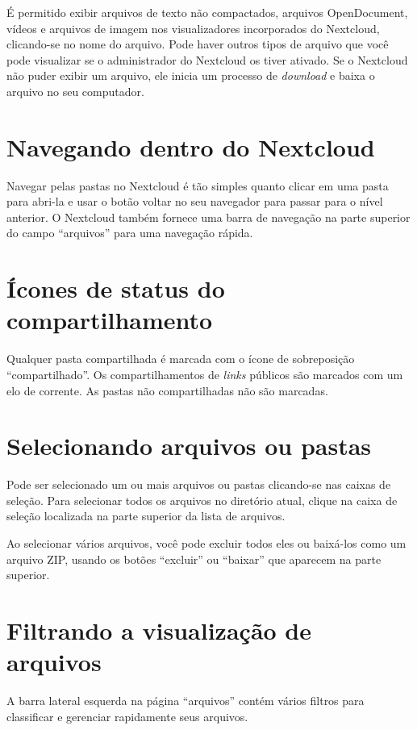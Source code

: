 \documentclass[openright, twoside, a4paper]{memoir}
\begin{document}
É permitido exibir arquivos de texto não compactados, arquivos
OpenDocument, vídeos e arquivos de imagem nos visualizadores
incorporados do Nextcloud, clicando-se no nome do arquivo. Pode haver
outros tipos de arquivo que você pode visualizar se o administrador do
Nextcloud os tiver ativado. Se o Nextcloud não puder exibir um arquivo,
ele inicia um processo de \emph{download} e baixa o arquivo no seu
computador.

\section{Navegando dentro do
Nextcloud}

Navegar pelas pastas no Nextcloud é tão simples quanto clicar em uma
pasta para abri-la e usar o botão voltar no seu navegador para passar
para o nível anterior. O Nextcloud também fornece uma barra de navegação
na parte superior do campo ``arquivos'' para uma navegação rápida.

\section{Ícones de status do
compartilhamento}

Qualquer pasta compartilhada é marcada com o ícone de sobreposição
``compartilhado''. Os compartilhamentos de \emph{links} públicos são
marcados com um elo de corrente. As pastas não compartilhadas não são
marcadas.

\section{Selecionando arquivos ou
pastas}

Pode ser selecionado um ou mais arquivos ou pastas clicando-se nas
caixas de seleção. Para selecionar todos os arquivos no diretório atual,
clique na caixa de seleção localizada na parte superior da lista de
arquivos.

Ao selecionar vários arquivos, você pode excluir todos eles ou baixá-los
como um arquivo ZIP, usando os botões ``excluir'' ou ``baixar'' que
aparecem na parte superior.

\section{Filtrando a visualização de
arquivos}

A barra lateral esquerda na página ``arquivos'' contém vários filtros
para classificar e gerenciar rapidamente seus arquivos.
\end{document}
